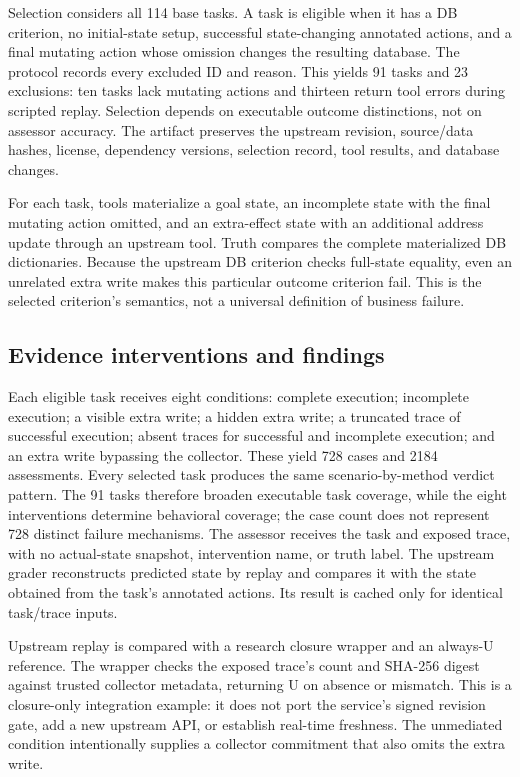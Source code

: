 \documentclass[11pt]{article}
\begin{document}
Selection considers all 114 base tasks. A task is eligible when it has a DB criterion, no initial-state setup, successful state-changing annotated actions, and a final mutating action whose omission changes the resulting database. The protocol records every excluded ID and reason. This yields 91 tasks and 23 exclusions: ten tasks lack mutating actions and thirteen return tool errors during scripted replay. Selection depends on executable outcome distinctions, not on assessor accuracy. The artifact preserves the upstream revision, source/data hashes, license, dependency versions, selection record, tool results, and database changes.

For each task, tools materialize a goal state, an incomplete state with the final mutating action omitted, and an extra-effect state with an additional address update through an upstream tool. Truth compares the complete materialized DB dictionaries. Because the upstream DB criterion checks full-state equality, even an unrelated extra write makes this particular outcome criterion fail. This is the selected criterion's semantics, not a universal definition of business failure.

\subsection{Evidence interventions and findings}
Each eligible task receives eight conditions: complete execution; incomplete execution; a visible extra write; a hidden extra write; a truncated trace of successful execution; absent traces for successful and incomplete execution; and an extra write bypassing the collector. These yield 728 cases and 2184 assessments. Every selected task produces the same scenario-by-method verdict pattern. The 91 tasks therefore broaden executable task coverage, while the eight interventions determine behavioral coverage; the case count does not represent 728 distinct failure mechanisms. The assessor receives the task and exposed trace, with no actual-state snapshot, intervention name, or truth label. The upstream grader reconstructs predicted state by replay and compares it with the state obtained from the task's annotated actions. Its result is cached only for identical task/trace inputs.

Upstream replay is compared with a research closure wrapper and an always-U reference. The wrapper checks the exposed trace's count and SHA-256 digest against trusted collector metadata, returning U on absence or mismatch. This is a closure-only integration example: it does not port the service's signed revision gate, add a new upstream API, or establish real-time freshness. The unmediated condition intentionally supplies a collector commitment that also omits the extra write.
\end{document}
